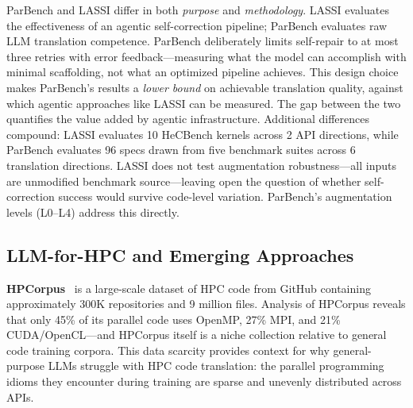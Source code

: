 \documentclass{article}
\begin{document}
ParBench and LASSI differ in both \emph{purpose} and \emph{methodology}. LASSI evaluates the effectiveness of an agentic self-correction pipeline; ParBench evaluates raw LLM translation competence. ParBench deliberately limits self-repair to at most three retries with error feedback---measuring what the model can accomplish with minimal scaffolding, not what an optimized pipeline achieves. This design choice makes ParBench's results a \emph{lower bound} on achievable translation quality, against which agentic approaches like LASSI can be measured. The gap between the two quantifies the value added by agentic infrastructure. Additional differences compound: LASSI evaluates 10 HeCBench kernels across 2 API directions, while ParBench evaluates 96 specs drawn from five benchmark suites across 6 translation directions. LASSI does not test augmentation robustness---all inputs are unmodified benchmark source---leaving open the question of whether self-correction success would survive code-level variation. ParBench's augmentation levels (L0--L4) address this directly.


\subsection{LLM-for-HPC and Emerging Approaches}
\label{sec:llm-hpc}

\textbf{HPCorpus}~\cite{HPCorpus2023} is a large-scale dataset of HPC code from GitHub containing approximately 300K repositories and 9 million files. Analysis of HPCorpus reveals that only 45\% of its parallel code uses OpenMP, 27\% MPI, and 21\% CUDA/OpenCL---and HPCorpus itself is a niche collection relative to general code training corpora. This data scarcity provides context for why general-purpose LLMs struggle with HPC code translation: the parallel programming idioms they encounter during training are sparse and unevenly distributed across APIs.

\end{document}
